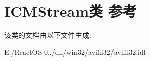 \hypertarget{class_i_c_m_stream}{}\section{I\+C\+M\+Stream类 参考}
\label{class_i_c_m_stream}


该类的文档由以下文件生成\+:\begin{DoxyCompactItemize}
\item 
E\+:/\+React\+O\+S-\/0../dll/win32/avifil32/avifil32.\+idl\end{DoxyCompactItemize}
